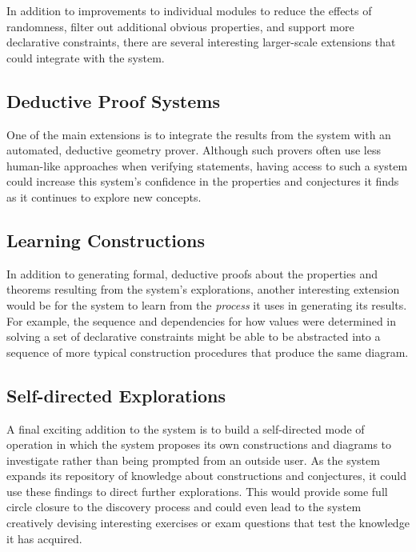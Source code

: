 In addition to improvements to individual modules to reduce the
effects of randomness, filter out additional obvious properties, and
support more declarative constraints, there are several interesting
larger-scale extensions that could integrate with the system.

\subsection{Deductive Proof Systems}

One of the main extensions is to integrate the results from the system
with an automated, deductive geometry prover. Although such provers
often use less human-like approaches when verifying statements, having
access to such a system could increase this system's confidence in the
properties and conjectures it finds as it continues to explore new
concepts.

\subsection{Learning Constructions}

In addition to generating formal, deductive proofs about the
properties and theorems resulting from the system's explorations,
another interesting extension would be for the system to learn from
the \emph{process} it uses in generating its results. For example, the
sequence and dependencies for how values were determined in solving a
set of declarative constraints might be able to be abstracted into a
sequence of more typical construction procedures that produce the same
diagram.

\subsection{Self-directed Explorations}

A final exciting addition to the system is to build a self-directed
mode of operation in which the system proposes its own constructions
and diagrams to investigate rather than being prompted from an outside
user.  As the system expands its repository of knowledge about
constructions and conjectures, it could use these findings to direct
further explorations.  This would provide some full circle closure to
the discovery process and could even lead to the system creatively
devising interesting exercises or exam questions that test the
knowledge it has acquired.
